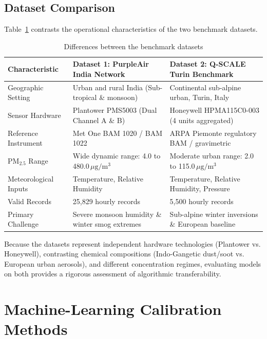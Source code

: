 \documentclass[11pt,a4paper]{article}
\begin{document}
\subsection{Dataset Comparison}
Table~\ref{tab:comparison} contrasts the operational characteristics of the two benchmark datasets.

\begin{table}[htbp]
\centering
\small
\caption{Differences between the benchmark datasets}
\label{tab:comparison}
\begin{tabularx}{\textwidth}{l X X}
\toprule
\textbf{Characteristic} & \textbf{Dataset 1: PurpleAir India Network} & \textbf{Dataset 2: Q-SCALE Turin Benchmark} \\
\midrule
Geographic Setting & Urban and rural India (Sub-tropical \& monsoon) & Continental sub-alpine urban, Turin, Italy \\
Sensor Hardware & Plantower PMS5003 (Dual Channel A \& B) & Honeywell HPMA115C0-003 (4 units aggregated) \\
Reference Instrument & Met One BAM 1020 / BAM 1022 & ARPA Piemonte regulatory BAM / gravimetric \\
$\text{PM}_{2.5}$ Range & Wide dynamic range: 4.0 to 480.0\,$\mu\text{g}/\text{m}^3$ & Moderate urban range: 2.0 to 115.0\,$\mu\text{g}/\text{m}^3$ \\
Meteorological Inputs & Temperature, Relative Humidity & Temperature, Relative Humidity, Pressure \\
Valid Records & 25,829 hourly records & 5,500 hourly records \\
Primary Challenge & Severe monsoon humidity \& winter smog extremes & Sub-alpine winter inversions \& European baseline \\
\bottomrule
\end{tabularx}
\end{table}

Because the datasets represent independent hardware technologies (Plantower vs. Honeywell), contrasting chemical compositions (Indo-Gangetic dust/soot vs. European urban aerosols), and different concentration regimes, evaluating models on both provides a rigorous assessment of algorithmic transferability.

\section{Machine-Learning Calibration Methods}
\end{document}
